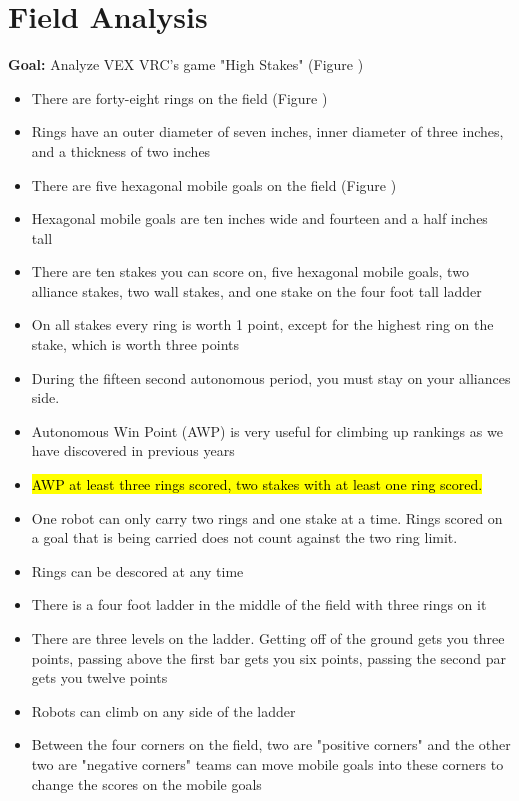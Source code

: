 \section*{Field Analysis}
{
\textbf{Goal:} Analyze VEX VRC's game "High Stakes" (Figure )
\begin{itemize}
\item There are forty-eight rings on the field (Figure )
\item Rings have an outer diameter of seven inches, inner diameter of three inches, and a thickness of two inches 
\item There are five hexagonal mobile goals on the field (Figure ) 
\item Hexagonal mobile goals are ten inches wide and fourteen and a half inches tall
\item There are ten stakes you can score on, five hexagonal mobile goals, two alliance stakes, two wall stakes, and one stake on the four foot tall ladder 
\item On all stakes every ring is worth 1 point, except for the highest ring on the stake, which is worth three points
\item During the fifteen second autonomous period, you must stay on your alliances side.
\item Autonomous Win Point (AWP) is very useful for climbing up rankings as we have discovered in previous years
\item \hl{AWP at least three rings scored, two stakes with at least one ring scored.}
\item One robot can only carry two rings and one stake at a time. Rings scored on a goal that is being carried does not count against the two ring limit.
\item Rings can be descored at any time 
\item There is a four foot ladder in the middle of the field with three rings on it 
\item There are three levels on the ladder. Getting off of the ground gets you three points, passing above the first bar gets you six points, passing the second par gets you twelve points 
\item Robots can climb on any side of the ladder 
\item Between the four corners on the field, two are "positive corners" and the other two are "negative corners" teams can move mobile goals into these corners to change the scores on the mobile goals 

\end{itemize}}
